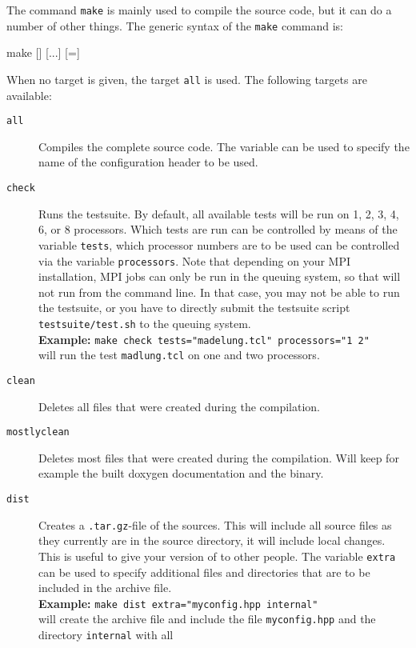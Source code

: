 The command \texttt{make} is mainly used to compile the \es source
code, but it can do a number of other things. The generic syntax of
the \texttt{make} command is:
\begin{code}
make [] [...] [=]
\end{code}
When no target is given, the target \texttt{all} is used. The
following targets are available:
\begin{description}
\item[\texttt{all}] Compiles the complete \es source code. The
  variable  can be used to specify the name of the
  configuration header to be used.
\item[\texttt{check}] Runs the testsuite. By default, all available
  tests will be run on 1, 2, 3, 4, 6, or 8 processors. Which tests are
  run can be controlled by means of the variable \texttt{tests}, which
  processor numbers are to be used can be controlled via the variable
  \texttt{processors}. Note that depending on your MPI installation,
  MPI jobs can only be run in the queuing system, so that \es{} will
  not run from the command line. In that case, you may not be able to
  run the testsuite, or you have to directly submit the testsuite script
  \verb!testsuite/test.sh! to the queuing system.\\
  \textbf{Example:} \verb!make check tests="madelung.tcl" processors="1 2"!\\
  will run the test \texttt{madlung.tcl} on one and two processors.
\item[\texttt{clean}] Deletes all files that were created during the
  compilation.
\item[\texttt{mostlyclean}] Deletes most files that were created
  during the compilation. Will keep for example the built doxygen
  documentation and the \es{} binary.
\item[\texttt{dist}] Creates a \texttt{.tar.gz}-file of the \es{}
  sources.  This will include all source files as they currently are
  in the source directory, \ie{} it will include local changes.  This
  is useful to give your version of \es{} to other people.
  The variable \texttt{extra} can be used to specify additional
  files and directories that are to be included in the archive
  file. \\
  \textbf{Example:} \verb!make dist extra="myconfig.hpp internal"!\\
  will create the archive file and include the file
  \texttt{myconfig.hpp} and the directory \texttt{internal} with all

\end{description}

